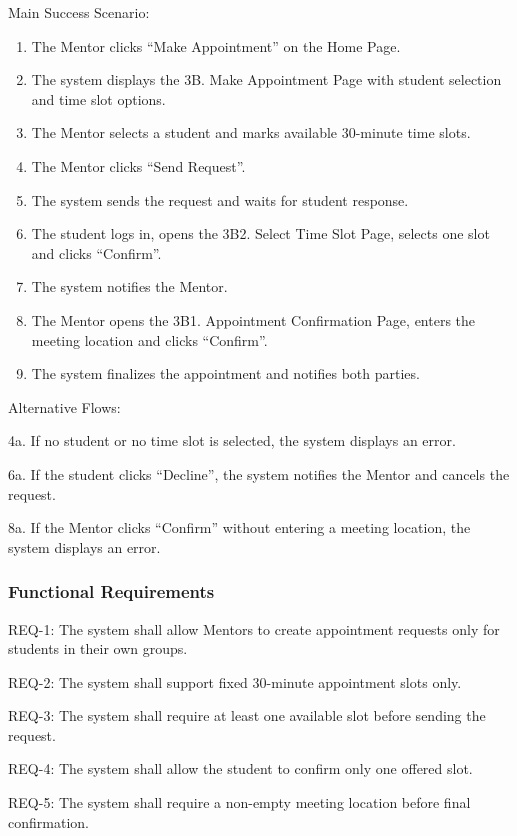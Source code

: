 Main Success Scenario:
\begin{enumerate}
\item The Mentor clicks ``Make Appointment'' on the Home Page.
\item The system displays the 3B. Make Appointment Page with student selection and time slot options.
\item The Mentor selects a student and marks available 30-minute time slots.
\item The Mentor clicks ``Send Request''.
\item The system sends the request and waits for student response.
\item The student logs in, opens the 3B2. Select Time Slot Page, selects one slot and clicks ``Confirm''.
\item The system notifies the Mentor.
\item The Mentor opens the 3B1. Appointment Confirmation Page, enters the meeting location and clicks ``Confirm''.
\item The system finalizes the appointment and notifies both parties.
\end{enumerate}

Alternative Flows:

4a. If no student or no time slot is selected, the system displays an error.

6a. If the student clicks ``Decline'', the system notifies the Mentor and cancels the request.

8a. If the Mentor clicks ``Confirm'' without entering a meeting location, the system displays an error.

\subsubsection{Functional Requirements}

REQ-1: The system shall allow Mentors to create appointment requests only for students in their own groups.

REQ-2: The system shall support fixed 30-minute appointment slots only.

REQ-3: The system shall require at least one available slot before sending the request.

REQ-4: The system shall allow the student to confirm only one offered slot.

REQ-5: The system shall require a non-empty meeting location before final confirmation.

